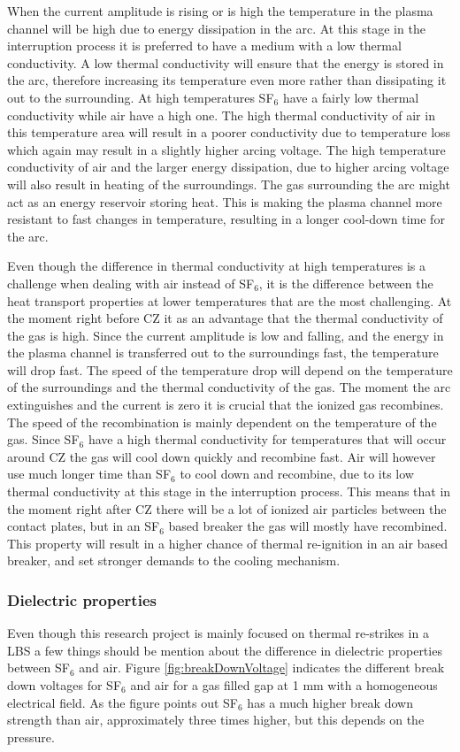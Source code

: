 \documentclass[10pt,a4paper]{article} %
\begin{document}
When the current amplitude is rising or is high the temperature in the plasma channel will be high due to energy dissipation in the arc. At this stage in the interruption process it is preferred to have a medium with a low thermal conductivity. A low thermal conductivity will ensure that the energy is stored in the arc, therefore increasing its temperature even more rather than dissipating it out to the surrounding. At high temperatures SF$_6$ have a fairly low thermal conductivity while air have a high one. The high thermal conductivity of air in this temperature area will result in a poorer conductivity due to temperature loss which again may result in a slightly higher arcing voltage. The high temperature conductivity of air and the larger energy dissipation, due to higher arcing voltage will also result in heating of the surroundings. The gas surrounding the arc might act as an energy reservoir storing heat. This is making the plasma channel more resistant to fast changes in temperature, resulting in a longer cool-down time for the arc.

Even though the difference in thermal conductivity at high temperatures is a challenge when dealing with air instead of SF$_6$, it is the difference between the heat transport properties at lower temperatures that are the most challenging. At the moment right before CZ it as an advantage that the thermal conductivity of the gas is high. Since the current amplitude is low and falling, and the energy in the plasma channel is transferred out to the surroundings fast, the temperature will drop fast. The speed of the temperature drop will depend on the temperature of the surroundings and the thermal conductivity of the gas. The moment the arc extinguishes and the current is zero it is crucial that the ionized gas recombines. The speed of the recombination is mainly dependent on the temperature of the gas. Since SF${_6}$ have a high thermal conductivity for temperatures that will occur around CZ the gas will cool down quickly and recombine fast. Air will however use much longer time than SF${_6}$ to cool down and recombine, due to its low thermal conductivity at this stage in the interruption process. This means that in the moment right after CZ there will be a lot of ionized air particles between the contact plates, but in an SF${_6}$ based breaker the gas will mostly have recombined. This property will result in a higher chance of thermal re-ignition in an air based breaker, and set stronger demands to the cooling mechanism.

\subsubsection*{Dielectric properties} %
Even though this research project is mainly focused on thermal re-strikes in a LBS a few things should be mention about the difference in dielectric properties between SF${_6}$ and air. Figure \ref{fig:breakDownVoltage} indicates the different break down voltages for SF$_6$ and air for a gas filled gap at 1 mm with a homogeneous electrical field. As the figure points out SF$_6$ has a much higher break down strength than air, approximately three times higher, but this depends on the pressure. 
\end{document}
